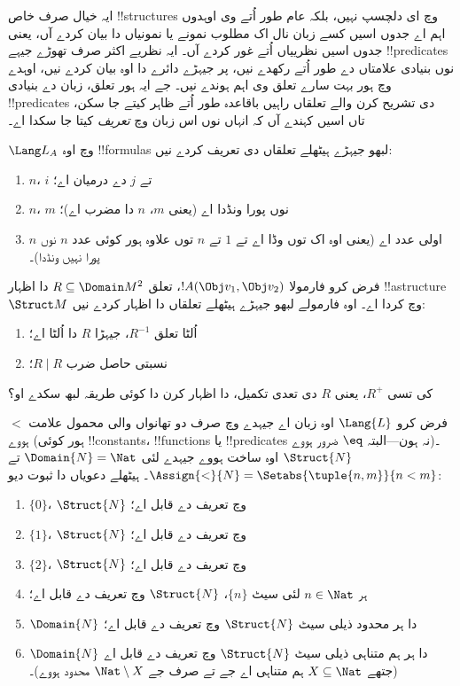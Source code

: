 \documentclass[../../../include/open-logic-section]{subfiles}
\begin{document}
\begin{explain}
ایہ خیال صرف خاص !!{structure}s وچ ای دلچسپ نہیں، بلکہ عام طور اُتے
وی اوہدوں اہم اے جدوں اسیں کسے زبان نال اک مطلوب نمونے یا نمونیاں
دا بیان کردے آں، یعنی جدوں اسیں نظرییاں اُتے غور کردے آں۔
ایہ نظریے اکثر صرف تھوڑے جیہے !!{predicate}s نوں بنیادی
علامتاں دے طور اُتے رکھدے نیں، پر جیہڑے دائرے دا اوہ بیان کردے
نیں، اوہدے وچ ہور بہت سارے تعلق وی اہم ہوندے نیں۔ جے ایہ ہور
تعلق، زبان دے بنیادی !!{predicate}s دی تشریح کرن والے تعلقاں
راہیں باقاعدہ طور اُتے ظاہر کیتے جا سکن، تاں اسیں کہندے آں کہ
انہاں نوں اس زبان وچ \emph{تعریف} کیتا جا سکدا اے۔
\end{explain}

\begin{prob}
$\Lang L_A$ وچ اوہ !!{formula}s لبھو جیہڑے ہیٹھلے تعلقاں
دی تعریف کردے نیں:
\begin{enumerate}
\item $n$، $i$ تے $j$ دے درمیان اے؛
\item $n$، $m$ نوں پورا ونڈدا اے (یعنی $m$، $n$ دا مضرب اے)؛
\item $n$ اولی عدد اے (یعنی اوہ اک توں وڈا اے تے $1$ تے $n$ توں علاوہ ہور کوئی عدد
  $n$ نوں پورا نہیں ونڈدا)۔
\end{enumerate}
\end{prob}

\begin{prob}
فرض کرو فارمولا $!A(\Obj v_1, \Obj v_2)$، تعلق
$R \subseteq \Domain M^2$ دا اظہار !!a{structure}~$\Struct M$
وچ کردا اے۔ اوہ
فارمولے لبھو جیہڑے ہیٹھلے تعلقاں دا اظہار کردے نیں:
\begin{enumerate}
\item اُلٹا تعلق $R^{-1}$، جیہڑا $R$ دا اُلٹا اے؛
\item نسبتی حاصل ضرب $R \mid R$؛
\end{enumerate}
کی تسی $R^+$، یعنی $R$ دی تعدی تکمیل، دا اظہار کرن دا کوئی
طریقہ لبھ سکدے او؟
\end{prob}

\begin{prob}
فرض کرو $\Lang{L}$ اوہ زبان اے جیہدے وچ صرف دو تھانواں
والی محمول علامت $<$ ہووے (ہور کوئی !!{constant}s،
!!{function}s یا !!{predicate}s نہ ہون---البتہ
$\eq$ ضرور ہووے)۔ $\Struct{N}$ اوہ ساخت ہووے جیہدے لئی
$\Domain{N} = \Nat$ تے
$\Assign{<}{N} = \Setabs{\tuple{n,m}}{n <
  m}$۔ ہیٹھلے دعویاں دا ثبوت دیو:
\begin{enumerate}
\item $\{ 0 \}$، $\Struct{N}$ وچ تعریف دے قابل اے؛
\item $\{ 1 \}$، $\Struct{N}$ وچ تعریف دے قابل اے؛
\item $\{ 2 \}$، $\Struct{N}$ وچ تعریف دے قابل اے؛
\item ہر $n \in \Nat$ لئی سیٹ $\{ n \}$،
  $\Struct{N}$ وچ تعریف دے قابل اے؛
\item $\Domain{N}$ دا ہر محدود ذیلی سیٹ
  $\Struct{N}$ وچ تعریف دے قابل اے؛
\item $\Domain{N}$ دا ہر ہم متناہی ذیلی سیٹ
  $\Struct{N}$ وچ تعریف دے قابل اے (جتھے
  $X \subseteq \Nat$ ہم متناہی اے جے تے صرف جے
  $\Nat \setminus X$ محدود ہووے)۔
\end{enumerate}
\end{prob}
\end{document}
